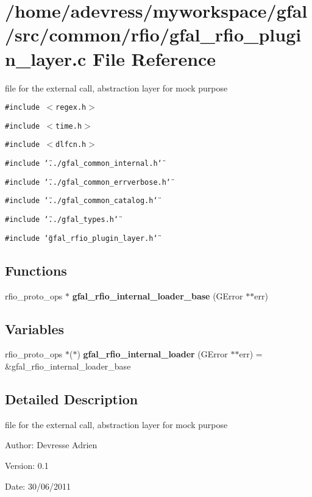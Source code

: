 \section{/home/adevress/myworkspace/gfal/src/common/rfio/gfal\_\-rfio\_\-plugin\_\-layer.c File Reference}
\label{gfal__rfio__plugin__layer_8c}
file for the external call, abstraction layer for mock purpose 

{\tt \#include $<$regex.h$>$}\par
{\tt \#include $<$time.h$>$}\par
{\tt \#include $<$dlfcn.h$>$}\par
{\tt \#include \char`\"{}../gfal\_\-common\_\-internal.h\char`\"{}}\par
{\tt \#include \char`\"{}../gfal\_\-common\_\-errverbose.h\char`\"{}}\par
{\tt \#include \char`\"{}../gfal\_\-common\_\-catalog.h\char`\"{}}\par
{\tt \#include \char`\"{}../gfal\_\-types.h\char`\"{}}\par
{\tt \#include \char`\"{}gfal\_\-rfio\_\-plugin\_\-layer.h\char`\"{}}\par
\subsection*{Functions}
\begin{CompactItemize}
\item 
rfio\_\-proto\_\-ops $\ast$ \textbf{gfal\_\-rfio\_\-internal\_\-loader\_\-base} (GError $\ast$$\ast$err)\label{gfal__rfio__plugin__layer_8c_6c40bba38f2b638d298d27a8d8cdb5bf}

\end{CompactItemize}
\subsection*{Variables}
\begin{CompactItemize}
\item 
rfio\_\-proto\_\-ops $\ast$($\ast$) \textbf{gfal\_\-rfio\_\-internal\_\-loader} (GError $\ast$$\ast$err) = \&gfal\_\-rfio\_\-internal\_\-loader\_\-base\label{gfal__rfio__plugin__layer_8c_6c17e62821e2194325693771c626b7bb}

\end{CompactItemize}


\subsection{Detailed Description}
file for the external call, abstraction layer for mock purpose 

\begin{Desc}
\item[Author:]Devresse Adrien \end{Desc}
\begin{Desc}
\item[Version:]0.1 \end{Desc}
\begin{Desc}
\item[Date:]30/06/2011 \end{Desc}

